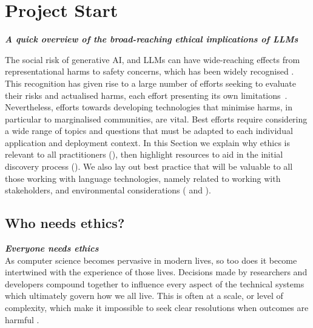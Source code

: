 \section{Project Start}\label{sec:start}
\noindent\textbf{\textit{A quick overview of the broad-reaching ethical implications of LLMs}}\newline

\noindent 
The social risk of generative AI, and LLMs can have wide-reaching effects from representational harms to safety concerns, which has been widely recognised \citet[see e.g.,][]{weidinger_ethical_2021,bender_dangers_2021,uzun_are_2023,wei_ai_2022}.
This recognition has given rise to a large number of efforts seeking to evaluate their risks and actualised harms, each effort presenting its own limitations~\cite{Solaiman_Evaluating_2024, goldfarb-tarrant_this_2023, blodgett_language_2020}.
Nevertheless, efforts towards developing technologies that minimise harms, in particular to marginalised communities, are vital.
Best efforts require considering a wide range of topics and questions that must be adapted to each individual application and deployment context. In this Section we explain why ethics is relevant to all practitioners (), then highlight resources to aid in the initial discovery process (). We also lay out best practice that will be valuable to all those working with language technologies, namely related to working with stakeholders, and environmental considerations ( and ).


\subsection{Who needs ethics?}\label{subsec:who}
\noindent\textbf{\textit{Everyone needs ethics}} \\

\noindent As computer science becomes pervasive in modern lives, so too does it become intertwined with the experience of those lives. Decisions made by researchers and developers compound together to influence every aspect of the technical systems which ultimately govern how we all live. This is often at a scale, or level of complexity, which make it impossible to seek clear resolutions when outcomes are harmful \citep{van2020embedding, kasirzadeh2021reasons, miller2021technology, birhane_values_2022, santurkar2023whose, pistilli2024civics}. 

